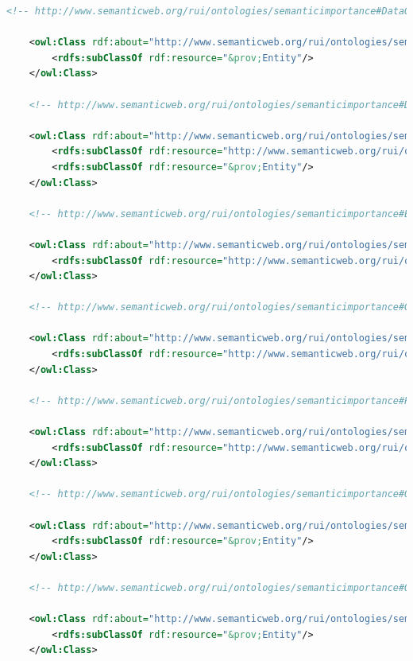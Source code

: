 \begin{lstlisting}[language=XML,caption={Semantic Importance Ontology File (update this file)}]
    <!-- http://www.semanticweb.org/rui/ontologies/semanticimportance#DataGraph -->

    <owl:Class rdf:about="http://www.semanticweb.org/rui/ontologies/semanticimportance#DataGraph">
        <rdfs:subClassOf rdf:resource="&prov;Entity"/>
    </owl:Class>
    
    <!-- http://www.semanticweb.org/rui/ontologies/semanticimportance#DataTrustWorthiness -->

    <owl:Class rdf:about="http://www.semanticweb.org/rui/ontologies/semanticimportance#DataTrustWorthiness">
        <rdfs:subClassOf rdf:resource="http://www.semanticweb.org/rui/ontologies/semanticimportance#SemanticImportance"/>
        <rdfs:subClassOf rdf:resource="&prov;Entity"/>
    </owl:Class>

    <!-- http://www.semanticweb.org/rui/ontologies/semanticimportance#ExpirationTimestamp -->

    <owl:Class rdf:about="http://www.semanticweb.org/rui/ontologies/semanticimportance#ExpirationTimestamp">
        <rdfs:subClassOf rdf:resource="http://www.semanticweb.org/rui/ontologies/semanticimportance#TemporalProvenance"/>
    </owl:Class>

    <!-- http://www.semanticweb.org/rui/ontologies/semanticimportance#GenerationTimestamp -->

    <owl:Class rdf:about="http://www.semanticweb.org/rui/ontologies/semanticimportance#GenerationTimestamp">
        <rdfs:subClassOf rdf:resource="http://www.semanticweb.org/rui/ontologies/semanticimportance#TemporalProvenance"/>
    </owl:Class>

    <!-- http://www.semanticweb.org/rui/ontologies/semanticimportance#Provenance -->

    <owl:Class rdf:about="http://www.semanticweb.org/rui/ontologies/semanticimportance#Provenance">
        <rdfs:subClassOf rdf:resource="http://www.semanticweb.org/rui/ontologies/semanticimportance#SemanticImportance"/>
    </owl:Class>

    <!-- http://www.semanticweb.org/rui/ontologies/semanticimportance#Query -->

    <owl:Class rdf:about="http://www.semanticweb.org/rui/ontologies/semanticimportance#Query">
        <rdfs:subClassOf rdf:resource="&prov;Entity"/>
    </owl:Class>

    <!-- http://www.semanticweb.org/rui/ontologies/semanticimportance#QueryEngine -->

    <owl:Class rdf:about="http://www.semanticweb.org/rui/ontologies/semanticimportance#QueryEngine">
        <rdfs:subClassOf rdf:resource="&prov;Entity"/>
    </owl:Class>


\end{lstlisting}
